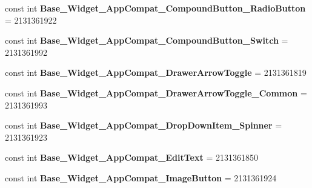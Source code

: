 \begin{DoxyCompactItemize}
\mbox{\label{class_pinned_app_1_1_droid_1_1_resource_1_1_style_a8d347d835932bd5bc92ec3d284672959}} 
const int {\bfseries Base\+\_\+\+Widget\+\_\+\+App\+Compat\+\_\+\+Compound\+Button\+\_\+\+Radio\+Button} = 2131361922
\item 
\mbox{\label{class_pinned_app_1_1_droid_1_1_resource_1_1_style_a8a809b9ecc61ced53357d61a8747f313}} 
const int {\bfseries Base\+\_\+\+Widget\+\_\+\+App\+Compat\+\_\+\+Compound\+Button\+\_\+\+Switch} = 2131361992
\item 
\mbox{\label{class_pinned_app_1_1_droid_1_1_resource_1_1_style_ae44aa8dab3be4ffc8c7dd3e7ea31a3ac}} 
const int {\bfseries Base\+\_\+\+Widget\+\_\+\+App\+Compat\+\_\+\+Drawer\+Arrow\+Toggle} = 2131361819
\item 
\mbox{\label{class_pinned_app_1_1_droid_1_1_resource_1_1_style_a52f75be52475a047fcc4f7fe4dc4a11b}} 
const int {\bfseries Base\+\_\+\+Widget\+\_\+\+App\+Compat\+\_\+\+Drawer\+Arrow\+Toggle\+\_\+\+Common} = 2131361993
\item 
\mbox{\label{class_pinned_app_1_1_droid_1_1_resource_1_1_style_a0f2be425be647de32912d28d5c5a3c2a}} 
const int {\bfseries Base\+\_\+\+Widget\+\_\+\+App\+Compat\+\_\+\+Drop\+Down\+Item\+\_\+\+Spinner} = 2131361923
\item 
\mbox{\label{class_pinned_app_1_1_droid_1_1_resource_1_1_style_ad5cbb05e904b319ee6edf0fa73771aa3}} 
const int {\bfseries Base\+\_\+\+Widget\+\_\+\+App\+Compat\+\_\+\+Edit\+Text} = 2131361850
\item 
\mbox{\label{class_pinned_app_1_1_droid_1_1_resource_1_1_style_a773e889234029049c3e35f895ae33c75}} 
const int {\bfseries Base\+\_\+\+Widget\+\_\+\+App\+Compat\+\_\+\+Image\+Button} = 2131361924
\item 
\mbox{\label{class_pinned_app_1_1_droid_1_1_resource_1_1_style_aaab876a41bf7093805ec263972188d11}} 

\end{DoxyCompactItemize}
